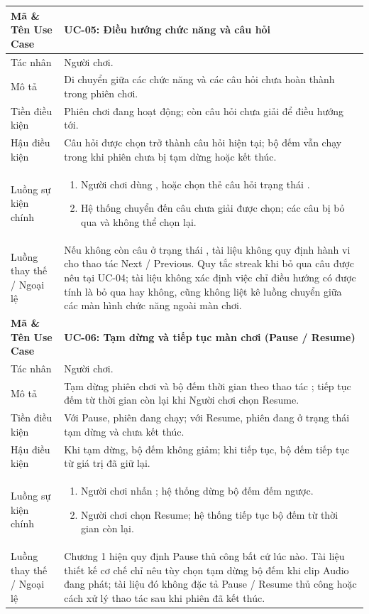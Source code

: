 \begin{xltabular}{\textwidth}{|L{3.3cm}|Y|}
\textbf{Mã \& Tên Use Case} & \textbf{UC-05: Điều hướng chức năng và câu hỏi} \\ \hline
Tác nhân & Người chơi. \\ \hline
Mô tả & Di chuyển giữa các chức năng và các câu hỏi chưa hoàn thành trong phiên chơi. \\ \hline
Tiền điều kiện & Phiên chơi đang hoạt động; còn câu hỏi chưa giải để điều hướng tới. \\ \hline
Hậu điều kiện & Câu hỏi được chọn trở thành câu hỏi hiện tại; bộ đếm vẫn chạy trong khi phiên chưa bị tạm dừng hoặc kết thúc. \\ \hline
Luồng sự kiện chính &
\begin{enumerate}[nosep,leftmargin=*]
    \item Người chơi dùng ,  hoặc chọn thẻ câu hỏi trạng thái .
    \item Hệ thống chuyển đến câu chưa giải được chọn; các câu  bị bỏ qua và không thể chọn lại.
\end{enumerate} \\ \hline
Luồng thay thế / Ngoại lệ & Nếu không còn câu ở trạng thái , tài liệu không quy định hành vi cho thao tác Next / Previous. Quy tắc streak khi bỏ qua câu được nêu tại UC-04; tài liệu không xác định việc chỉ điều hướng có được tính là bỏ qua hay không, cũng không liệt kê luồng chuyển giữa các màn hình chức năng ngoài màn chơi. \\ \hline

\textbf{Mã \& Tên Use Case} & \textbf{UC-06: Tạm dừng và tiếp tục màn chơi (Pause / Resume)} \\ \hline
Tác nhân & Người chơi. \\ \hline
Mô tả & Tạm dừng phiên chơi và bộ đếm thời gian theo thao tác ; tiếp tục đếm từ thời gian còn lại khi Người chơi chọn Resume. \\ \hline
Tiền điều kiện & Với Pause, phiên đang chạy; với Resume, phiên đang ở trạng thái tạm dừng và chưa kết thúc. \\ \hline
Hậu điều kiện & Khi tạm dừng, bộ đếm không giảm; khi tiếp tục, bộ đếm tiếp tục từ giá trị  đã giữ lại. \\ \hline
Luồng sự kiện chính &
\begin{enumerate}[nosep,leftmargin=*]
    \item Người chơi nhấn ; hệ thống dừng bộ đếm đếm ngược.
    \item Người chơi chọn Resume; hệ thống tiếp tục bộ đếm từ thời gian còn lại.
\end{enumerate} \\ \hline
Luồng thay thế / Ngoại lệ & Chương 1 hiện quy định Pause thủ công bất cứ lúc nào. Tài liệu thiết kế cơ chế chỉ nêu tùy chọn tạm dừng bộ đếm khi clip Audio đang phát; tài liệu đó không đặc tả Pause / Resume thủ công hoặc cách xử lý thao tác sau khi phiên đã kết thúc. \\ \hline


\end{xltabular}
